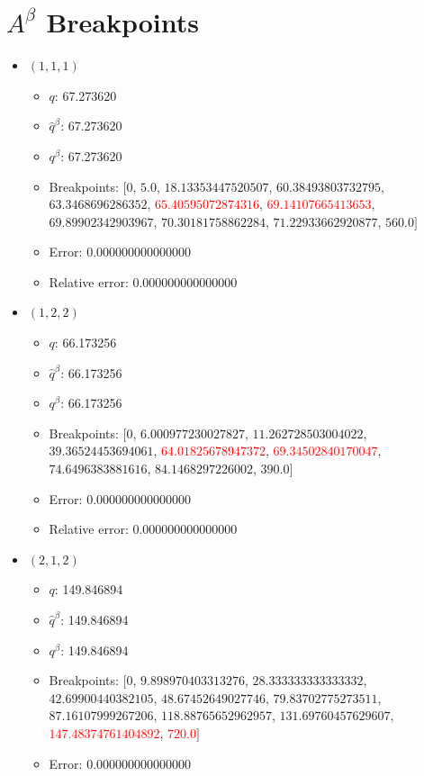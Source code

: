 \documentclass{article}%
\begin{document}
\section{$A^\beta$ Breakpoints}%
\thispagestyle{plain}%
\begin{itemize}%
	\item $(1, 1, 1)$%
	\begin{itemize}%
		\item $q$: 67.273620%
		\item $\hat{q}^\beta$: 67.273620%
		\item $q^\beta$: 67.273620%
		\item Breakpoints: $[$$0$, $5.0$, $18.13353447520507$, $60.38493803732795$, $63.3468696286352$, \textcolor{red}{$65.40595072874316$}, \textcolor{red}{$69.14107665413653$}, $69.89902342903967$, $70.30181758862284$, $71.22933662920877$, $560.0$$]$%
		\item Error: 0.000000000000000%
		\item Relative error: 0.000000000000000%
	\end{itemize}%
	\item $(1, 2, 2)$%
	\begin{itemize}%
		\item $q$: 66.173256%
		\item $\hat{q}^\beta$: 66.173256%
		\item $q^\beta$: 66.173256%
		\item Breakpoints: $[$$0$, $6.000977230027827$, $11.262728503004022$, $39.36524453694061$, \textcolor{red}{$64.01825678947372$}, \textcolor{red}{$69.34502840170047$}, $74.6496383881616$, $84.1468297226002$, $390.0$$]$%
		\item Error: 0.000000000000000%
		\item Relative error: 0.000000000000000%
	\end{itemize}%
	\item $(2, 1, 2)$%
	\begin{itemize}%
		\item $q$: 149.846894%
		\item $\hat{q}^\beta$: 149.846894%
		\item $q^\beta$: 149.846894%
		\item Breakpoints: $[$$0$, $9.898970403313276$, $28.333333333333332$, $42.69900440382105$, $48.67452649027746$, $79.83702775273511$, $87.16107999267206$, $118.88765652962957$, $131.69760457629607$, \textcolor{red}{$147.48374761404892$}, \textcolor{red}{$720.0$}$]$%
		\item Error: 0.000000000000000%
$$
\end{itemize}
\end{itemize}
\end{document}
